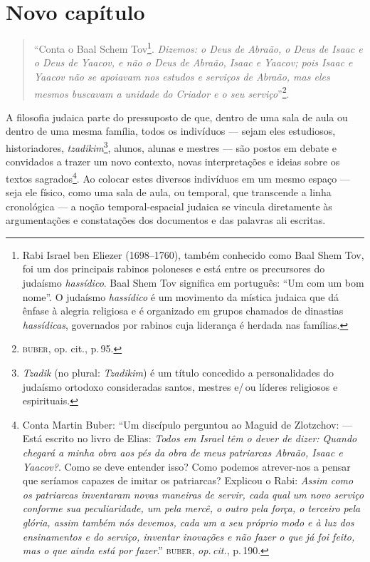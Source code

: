 \chapter{Novo capítulo}

\noindent{}\begin{quote}
``Conta o Baal Schem Tov\footnote{Rabi Israel ben Eliezer (1698--1760),
  também conhecido como Baal Shem Tov, foi um dos principais rabinos
  poloneses e está entre os precursores do judaísmo \emph{hassídico}.
  Baal Shem Tov significa em português: ``Um com um bom nome''. O judaísmo \emph{hassídico} é um movimento da mística judaica
  que dá ênfase à alegria religiosa e é organizado em grupos chamados de
  dinastias \emph{hassídicas}, governados por rabinos cuja liderança é
  herdada nas famílias.}. \emph{Dizemos: o Deus de Abraão, o Deus de Isaac e
o Deus de Yaacov, e não o Deus de Abraão, Isaac e Yaacov; pois Isaac e
Yaacov não se apoiavam nos estudos e serviços de Abraão, mas eles mesmos
buscavam a unidade do Criador e o seu serviço}''\footnote{\textsc{buber}, op.
  cit., p.\,95.}.
\end{quote}

A filosofia judaica parte do pressuposto de que, dentro de uma sala de
aula ou dentro de uma mesma família, todos os indivíduos --- sejam eles
estudiosos, historiadores, \emph{tzadikim}\footnote{\emph{Tzadik} (no
  plural: \emph{Tzadikim}) é um título concedido a personalidades do
  judaísmo ortodoxo consideradas santos, mestres e/\,ou líderes religiosos
  e espirituais.}, alunos, alunas e mestres --- são postos em debate e
convidados a trazer um novo contexto, novas interpretações e ideias
sobre os textos sagrados\footnote{Conta Martin Buber: ``Um
  discípulo perguntou ao Maguid de Zlotzchov: --- Está escrito no livro
  de Elias: \emph{Todos em Israel têm o dever de dizer: Quando chegará a
  minha obra aos pés da obra de meus patriarcas Abraão, Isaac e
  Yaacov?}. Como se deve entender isso? Como podemos atrever-nos a
  pensar que seríamos capazes de imitar os patriarcas? Explicou o Rabi:
  \emph{Assim como os patriarcas inventaram novas maneiras de servir, cada
  qual um novo serviço conforme sua peculiaridade, um pela mercê, o
  outro pela força, o terceiro pela glória, assim também nós devemos,
  cada um a seu próprio modo e à luz dos ensinamentos e do serviço,
  inventar inovações e não fazer o que já foi feito, mas o que ainda
  está por fazer}.'' \textsc{buber}, \emph{op.\,cit.}, p.\,190.}. Ao colocar estes diversos indivíduos
em um mesmo espaço --- seja ele físico, como uma sala de aula, ou
temporal, que transcende a linha cronológica --- a noção
temporal-espacial judaica se vincula diretamente às argumentações e
constatações dos documentos e das palavras ali escritas.

